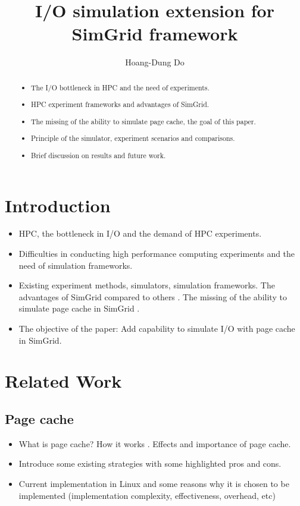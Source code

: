 \documentclass[conference]{IEEEtran}
\begin{document}
\title{I/O simulation extension for SimGrid framework}
\author{Hoang-Dung Do}
\maketitle

	\begin{abstract}
		\begin{itemize}
			\item The I/O bottleneck in HPC and the need of experiments.
			\item HPC experiment frameworks and advantages of SimGrid.
			\item The missing of the ability to simulate page cache, the goal of this paper.
			\item Principle of the simulator, experiment scenarios and comparisons.
			\item Brief discussion on results and future work.
		\end{itemize}
	\end{abstract}

	\section{Introduction}
		\begin{itemize}
			\item HPC, the bottleneck in I/O and the demand of HPC experiments. 
			\item Difficulties in conducting high performance computing experiments and the need of simulation frameworks.
			\item Existing experiment methods, simulators, simulation frameworks. The advantages of SimGrid compared to others \cite{casanova2008, lebre2015}. The missing of the ability to simulate page cache in SimGrid \cite{lebre2015}.
			\item The objective of the paper: Add capability to simulate I/O with page cache in SimGrid.
		\end{itemize}
	\section{Related Work}			
		
		\subsection{Page cache}
			\begin{itemize}
				\item What is page cache? How it works \cite{linuxdev3rd2010}. Effects and importance of page cache.
				\item Introduce some existing strategies with some highlighted pros and cons.
				\item Current implementation in Linux and some reasons why it is chosen to be implemented (implementation complexity, effectiveness, overhead, etc) \cite{linuxdev3rd2010}
			\end{itemize}									
\end{document}

